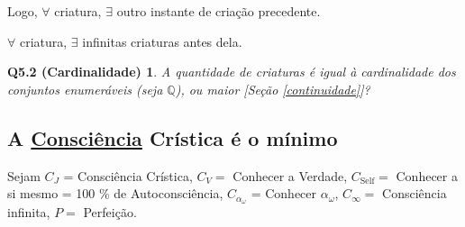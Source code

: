 \documentclass[12pt,a4paper]{article}
\begin{document}
			Logo, $ \forall $ criatura\footnotemark[1], $ \exists $ outro instante de cria\c{c}\~ao precedente.


			$ \forall $ criatura, $ \exists $ infinitas criaturas antes dela.

			\newtheorem{Q5.2}{Q5.2 (Cardinalidade)}
			\begin{Q5.2} A quantidade de criaturas \'e igual \`a cardinalidade dos conjuntos enumer\'aveis (seja $ \mathbb{Q} $), ou maior [Se\c{c}\~ao \ref{continuidade}]?
			\end{Q5.2}

		\subsection{A \href{http://sites.google.com/site/mathspirituality/portugues/Consci\%C3\%AAnciaCr\%C3\%ADstica.ASF?attredirects=0}{Consci\^encia} Cr\'istica \'e o m\'inimo}\label{ccristica}
			\begin{flushright}
			\end{flushright}

			Sejam
			$C_J$ = Consci\^encia Cr\'istica,
			$C_V = $ Conhecer a Verdade,
			$ C_{\mathrm{Self}} = $ Conhecer a si mesmo = 100 \% de Autoconsci\^encia,
			$ C_{\alpha_\omega} $ = Conhecer $ \alpha_\omega $,
			$C_\infty =$ Consci\^encia infinita,
			$P = $ Perfei\c{c}\~ao.

\end{document}
